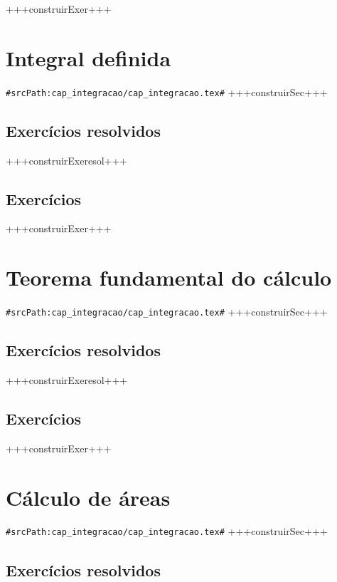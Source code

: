 +++construirExer+++


\section{Integral definida}
\verb+#srcPath:cap_integracao/cap_integracao.tex#+
+++construirSec+++

\subsection*{Exercícios resolvidos}

+++construirExeresol+++


\subsection*{Exercícios}

+++construirExer+++


\section{Teorema fundamental do cálculo}
\verb+#srcPath:cap_integracao/cap_integracao.tex#+
+++construirSec+++

\subsection*{Exercícios resolvidos}

+++construirExeresol+++


\subsection*{Exercícios}

+++construirExer+++


\section{Cálculo de áreas}
\verb+#srcPath:cap_integracao/cap_integracao.tex#+
+++construirSec+++

\subsection*{Exercícios resolvidos}

